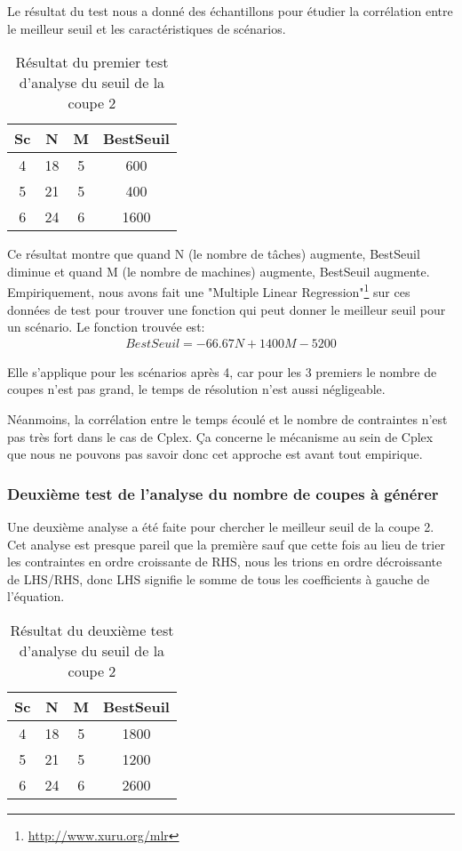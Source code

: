 \documentclass[twoside,fleqn]{EPURapport}
\begin{document}
Le résultat du test nous a donné des échantillons pour étudier la corrélation entre le meilleur seuil et les caractéristiques de scénarios.

\begin{table}[h]
    \centering
    \begin{tabular}{|c|c|c|c|}
    	\hline
Sc& 	N	& M	& BestSeuil\\ \hline
4 & 	18	& 5	& 600      \\ \hline
5 & 	21	& 5	& 400      \\ \hline
6 & 	24	& 6	& 1600     \\ \hline
    \end{tabular}
    \label{tab_pre_2_seuil}
    \caption{Résultat du premier test d'analyse du seuil de la coupe 2}
\end{table}
\bigskip

Ce résultat montre que quand N (le nombre de tâches) augmente, BestSeuil diminue et quand M (le nombre de machines) augmente, BestSeuil augmente. Empiriquement, nous avons fait une "Multiple Linear Regression"\footnote{\url{http://www.xuru.org/mlr}} sur ces données de test pour trouver une fonction qui peut donner le meilleur seuil pour un scénario. Le fonction trouvée est:
\begin{align}
BestSeuil=-66.67N+1400M-5200 
\end{align}

Elle s'applique pour les scénarios après 4, car pour les 3 premiers le nombre de coupes n'est pas grand, le temps de résolution n'est aussi négligeable.

Néanmoins, la corrélation entre le temps écoulé et le nombre de contraintes n'est pas très fort dans le cas de Cplex. Ça concerne le mécanisme au sein de Cplex que nous ne pouvons pas savoir donc cet approche est avant tout empirique.

\subsubsection{Deuxième test de l'analyse du nombre de coupes à générer}
Une deuxième analyse a été faite pour chercher le meilleur seuil de la coupe 2. Cet analyse est presque pareil que la première sauf que cette fois au lieu de trier les contraintes en ordre croissante de RHS, nous les trions en ordre décroissante de LHS/RHS, donc LHS signifie le somme de tous les coefficients à gauche de l'équation.

\begin{table}[h]
    \centering
    \begin{tabular}{|c|c|c|c|}
    	\hline
Sc& 	N	& M	& BestSeuil\\ \hline
4 & 	18	& 5	& 1800      \\ \hline
5 & 	21	& 5	& 1200      \\ \hline
6 & 	24	& 6	& 2600     \\ \hline
    \end{tabular}
    \label{tab_pre_2_seuil2}
    \caption{Résultat du deuxième test d'analyse du seuil de la coupe 2}
\end{table}
\bigskip
\end{document}
